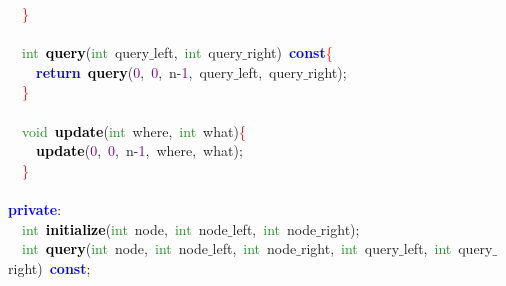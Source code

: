 {{\mbox{}\ \ \textcolor{Red}{\}} \\
\mbox{} \\
\mbox{}\ \ \textcolor{ForestGreen}{int}\ \textbf{\textcolor{Black}{query}}\textcolor{BrickRed}{(}\textcolor{ForestGreen}{int}\ query$\_$left\textcolor{BrickRed}{,}\ \textcolor{ForestGreen}{int}\ query$\_$right\textcolor{BrickRed}{)}\ \textbf{\textcolor{Blue}{const}}\textcolor{Red}{\{} \\
\mbox{}\ \ \ \ \textbf{\textcolor{Blue}{return}}\ \textbf{\textcolor{Black}{query}}\textcolor{BrickRed}{(}\textcolor{Purple}{0}\textcolor{BrickRed}{,}\ \textcolor{Purple}{0}\textcolor{BrickRed}{,}\ n\textcolor{BrickRed}{-}\textcolor{Purple}{1}\textcolor{BrickRed}{,}\ query$\_$left\textcolor{BrickRed}{,}\ query$\_$right\textcolor{BrickRed}{);} \\
\mbox{}\ \ \textcolor{Red}{\}} \\
\mbox{} \\
\mbox{}\ \ \textcolor{ForestGreen}{void}\ \textbf{\textcolor{Black}{update}}\textcolor{BrickRed}{(}\textcolor{ForestGreen}{int}\ where\textcolor{BrickRed}{,}\ \textcolor{ForestGreen}{int}\ what\textcolor{BrickRed}{)}\textcolor{Red}{\{} \\
\mbox{}\ \ \ \ \textbf{\textcolor{Black}{update}}\textcolor{BrickRed}{(}\textcolor{Purple}{0}\textcolor{BrickRed}{,}\ \textcolor{Purple}{0}\textcolor{BrickRed}{,}\ n\textcolor{BrickRed}{-}\textcolor{Purple}{1}\textcolor{BrickRed}{,}\ where\textcolor{BrickRed}{,}\ what\textcolor{BrickRed}{);} \\
\mbox{}\ \ \textcolor{Red}{\}} \\
\mbox{} \\
\mbox{}\textbf{\textcolor{Blue}{private}}\textcolor{BrickRed}{:} \\
\mbox{}\ \ \textcolor{ForestGreen}{int}\ \textbf{\textcolor{Black}{initialize}}\textcolor{BrickRed}{(}\textcolor{ForestGreen}{int}\ node\textcolor{BrickRed}{,}\ \textcolor{ForestGreen}{int}\ node$\_$left\textcolor{BrickRed}{,}\ \textcolor{ForestGreen}{int}\ node$\_$right\textcolor{BrickRed}{);} \\
\mbox{}\ \ \textcolor{ForestGreen}{int}\ \textbf{\textcolor{Black}{query}}\textcolor{BrickRed}{(}\textcolor{ForestGreen}{int}\ node\textcolor{BrickRed}{,}\ \textcolor{ForestGreen}{int}\ node$\_$left\textcolor{BrickRed}{,}\ \textcolor{ForestGreen}{int}\ node$\_$right\textcolor{BrickRed}{,}\ \textcolor{ForestGreen}{int}\ query$\_$left\textcolor{BrickRed}{,}\ \textcolor{ForestGreen}{int}\ query$\_$right\textcolor{BrickRed}{)}\ \textbf{\textcolor{Blue}{const}}\textcolor{BrickRed}{;} \\
}}
